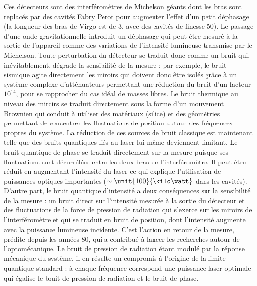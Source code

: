 \documentclass[12pt,a4paper]{article}
\begin{document}
Ces détecteurs sont des interféromètres de Michelson géants dont les bras sont replacés par des cavités Fabry Perot pour augmenter l'effet d'un petit déphasage (la longueur des bras de Virgo est de \unit{3}{\kilo\meter}, avec des cavités de finesse 50).
Le passage d'une onde gravitationnelle introduit un déphasage qui peut être mesuré à la sortie de l'appareil comme des variations de l'intensité lumineuse transmise par le Michelson.
Toute perturbation du détecteur se traduit donc comme un bruit qui, inévitablement, dégrade la sensibilité de la mesure : par exemple, le bruit sismique agite directement les miroirs qui doivent donc être isolés grâce à un système complexe d'atténuateurs permettant une réduction du bruit d'un facteur $10^{14}$, pour se rapprocher du cas idéal de masses libres.
Le bruit thermique au niveau des miroirs se traduit directement sous la forme d'un mouvement Brownien qui conduit à utiliser des matériaux (silice) et des géométries permettant de concentrer les fluctuations de position autour des fréquences propres du système.
La réduction de ces sources de bruit classique est maintenant telle que des bruits quantiques liés au laser lui même deviennent limitant.
Le bruit quantique de phase se traduit directement sur la mesure puisque ses fluctuations sont décorrélées entre les deux bras de l'interféromètre.
Il peut être réduit en augmentant l'intensité du laser ce qui explique l'utilisation de puissances optiques importantes ($\sim \unit{100}{\kilo\watt}$ dans les cavités).
D'autre part, le bruit quantique d'intensité a deux conséquences sur la sensibilité de la mesure : un bruit direct sur l'intensité mesurée à la sortie du détecteur et des fluctuations de la force de pression de radiation qui s'exerce sur les miroirs de l'interféromètre et qui se traduit en bruit de position, dont l'intensité augmente avec la puissance lumineuse incidente.
C'est l'action en retour de la mesure, prédite depuis les années 80, qui a contribué à lancer les recherches autour de l'optomécanique.
Le bruit de pression de radiation étant modulé par la réponse mécanique du système, il en résulte un compromis à l'origine de la limite quantique standard : à chaque fréquence correspond une puissance laser optimale qui égalise le bruit de pression de radiation et le bruit de phase.
\end{document}
